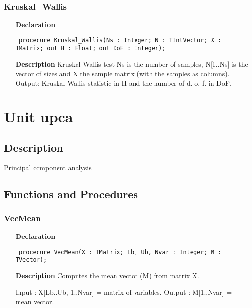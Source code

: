 \documentclass[12pt,a4paper,oneside]{report}
\newcommand{\declarationitem}[1]{\textbf{#1}}
\newcommand{\descriptiontitle}[1]{\textbf{#1}}
\newcommand{\code}[1]{\texttt{#1}}
\begin{document}
\subsubsection{Kruskal{\_}Wallis}
\label{unonpar-Kruskal_Wallis}
\begin{itemize}\item[\declarationitem{Declaration}\hfill]
	\begin{flushleft}
		\code{
			procedure Kruskal{\_}Wallis(Ns : Integer; N : TIntVector; X : TMatrix; out H : Float; out DoF : Integer);}
	\end{flushleft}
	\item[\descriptiontitle{Description}]
	Kruskal{-}Wallis test Ns is the number of samples, N[1..Ns] is the vector of sizes and X the sample matrix (with the samples as columns). Output: Kruskal{-}Wallis statistic in H and the number of d. o. f. in DoF.
\end{itemize}


\section{Unit upca}
\label{upca}
\subsection{Description}
Principal component analysis 
\subsection{Functions and Procedures}
\subsubsection{VecMean}
\label{upca-VecMean}
\begin{itemize}\item[\declarationitem{Declaration}\hfill]
	\begin{flushleft}
		\code{
			procedure VecMean(X : TMatrix; Lb, Ub, Nvar : Integer; M : TVector);}
	\end{flushleft}
	\par
	\item[\descriptiontitle{Description}]
	Computes the mean vector (M) from matrix X.
	
	Input : X[Lb..Ub, 1..Nvar] = matrix of variables. Output : M[1..Nvar] = mean vector.
\end{itemize}
\end{document}
